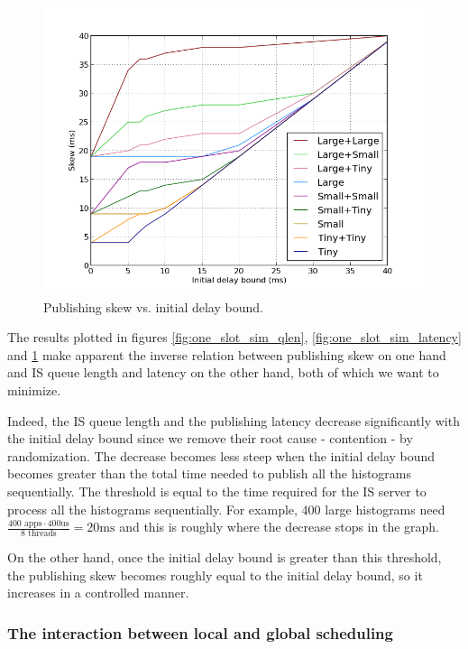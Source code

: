 \begin{figure}[ht]
\centering
\includegraphics[scale=0.5]{Images/one_slot_sim_skew.png}
\caption{Publishing skew vs. initial delay bound.}
\label{fig:one_slot_sim_skew}
\end{figure}

The results plotted in figures \ref{fig:one_slot_sim_qlen}, \ref{fig:one_slot_sim_latency} and \ref{fig:one_slot_sim_skew} make apparent the inverse relation between publishing skew on one hand and IS queue length and latency on the other hand, both of which we want to minimize. 

Indeed, the IS queue length and the publishing latency decrease significantly with the initial delay bound since we remove their root cause - contention - by randomization. The decrease becomes less steep when the initial delay bound becomes greater than the total time needed to publish all the histograms sequentially. The threshold is equal to the time required for the IS server to process all the histograms sequentially. For example, 400 large histograms need $\frac {400 \text{ apps}\cdot 400 \text{us}} {8 \text{ threads}} = 20\text{ms}$ and this is roughly where the decrease stops in the graph.

On the other hand, once the initial delay bound is greater than this threshold, the publishing skew becomes roughly equal to the initial delay bound, so it increases in a controlled manner.

\subsubsection*{The interaction between local and global scheduling}

